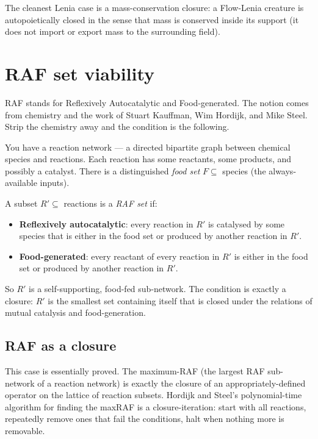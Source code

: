 The cleanest Lenia case is a mass-conservation closure: a Flow-Lenia
creature is autopoietically closed in the sense that mass is conserved
inside its support (it does not import or export mass to the
surrounding field).

\section{RAF set viability}

RAF stands for Reflexively Autocatalytic and Food-generated. The
notion comes from chemistry and the work of Stuart Kauffman, Wim
Hordijk, and Mike Steel. Strip the chemistry away and the condition is
the following.

You have a reaction network --- a directed bipartite graph between
chemical species and reactions. Each reaction has some reactants, some
products, and possibly a catalyst. There is a distinguished \emph{food
set} $F \subseteq$ species (the always-available inputs).

A subset $R' \subseteq$ reactions is a \emph{RAF set} if:

\begin{itemize}[leftmargin=1.5em,itemsep=2pt]
  \item \textbf{Reflexively autocatalytic}: every reaction in $R'$ is
    catalysed by some species that is either in the food set or
    produced by another reaction in $R'$.
  \item \textbf{Food-generated}: every reactant of every reaction in
    $R'$ is either in the food set or produced by another reaction
    in $R'$.
\end{itemize}

So $R'$ is a self-supporting, food-fed sub-network. The condition is
exactly a closure: $R'$ is the smallest set containing itself that is
closed under the relations of mutual catalysis and food-generation.

\subsection*{RAF as a closure}

This case is essentially proved. The maximum-RAF (the largest RAF
sub-network of a reaction network) is exactly the closure of an
appropriately-defined operator on the lattice of reaction subsets.
Hordijk and Steel's polynomial-time algorithm for finding the maxRAF
is a closure-iteration: start with all reactions, repeatedly remove
ones that fail the conditions, halt when nothing more is removable.

